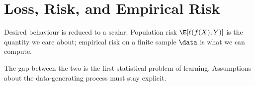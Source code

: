 \chapter{Loss, Risk, and Empirical Risk}
\label{ch:loss-and-risk}

Desired behaviour is reduced to a scalar. Population risk $\E[\ell(f(X),Y)]$ is the quantity we care about; empirical risk on a finite sample $\data$ is what we can compute.

The gap between the two is the first statistical problem of learning. Assumptions about the data-generating process must stay explicit.
